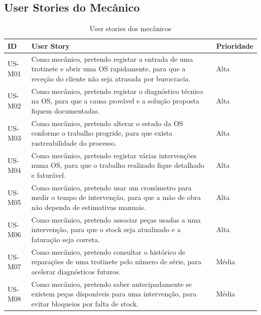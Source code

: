 \documentclass[a4paper,12pt]{scrreprt}
\begin{document}
        \subsection{User Stories do Mecânico}
        \begin{table}[H]
            \centering
            \small
            \begin{tabular}{|p{1.8cm}|p{10.6cm}|p{2.6cm}|}
                \hline
                \rowcolor{gray!20!white}
                \textbf{ID} & \textbf{User Story} & \textbf{Prioridade} \\
                \hline
                US-M01 & Como mecânico, pretendo registar a entrada de uma trotinete e abrir uma OS rapidamente, para que a receção do cliente não seja atrasada por burocracia. & Alta \\
                \hline
                US-M02 & Como mecânico, pretendo registar o diagnóstico técnico na OS, para que a causa provável e a solução proposta fiquem documentadas. & Alta \\
                \hline
                US-M03 & Como mecânico, pretendo alterar o estado da OS conforme o trabalho progride, para que exista rastreabilidade do processo. & Alta \\
                \hline
                US-M04 & Como mecânico, pretendo registar várias intervenções numa OS, para que o trabalho realizado fique detalhado e faturável. & Alta \\
                \hline
                US-M05 & Como mecânico, pretendo usar um cronómetro para medir o tempo de intervenção, para que a mão de obra não dependa de estimativas manuais. & Alta \\
                \hline
                US-M06 & Como mecânico, pretendo associar peças usadas a uma intervenção, para que o stock seja atualizado e a faturação seja correta. & Alta \\
                \hline
                US-M07 & Como mecânico, pretendo consultar o histórico de reparações de uma trotinete pelo número de série, para acelerar diagnósticos futuros. & Média \\
                \hline
                US-M08 & Como mecânico, pretendo saber antecipadamente se existem peças disponíveis para uma intervenção, para evitar bloqueios por falta de stock. & Média \\
                \hline
            \end{tabular}
            \caption{User stories dos mecânicos}
        \end{table}
\end{document}
